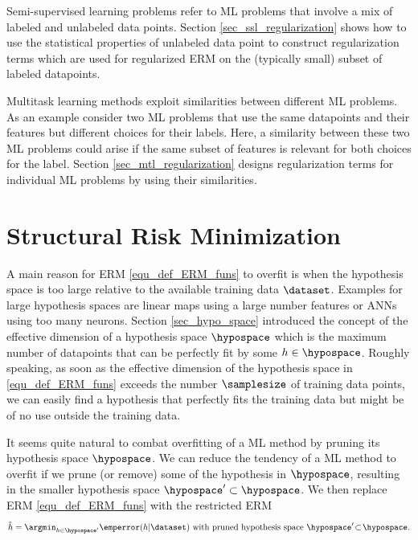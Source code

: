 \documentclass[12pt]{report}
\begin{document}
Semi-supervised learning problems refer to ML problems that involve a mix of 
labeled and unlabeled data points. Section \ref{sec_ssl_regularization} shows 
how to use the statistical properties of unlabeled data point to construct 
regularization terms which are used for regularized ERM on the (typically small) 
subset of labeled datapoints. 

Multitask learning methods exploit similarities between different ML problems. 
As an example consider two ML problems that use the same datapoints and 
their features but different choices for their labels. Here, a similarity between 
these two ML problems could arise if the same subset of features is relevant 
for both choices for the label. Section \ref{sec_mtl_regularization} designs 
regularization terms for individual ML problems by using their similarities. 



\section{Structural Risk Minimization} 
\label{sec_reg_ERM}

A main reason for ERM \eqref{equ_def_ERM_funs} to overfit is when the hypothesis space is 
too large relative to the available training data $\dataset$. Examples for large hypothesis spaces 
are linear maps using a large number features or ANNs using too many neurons. Section \ref{sec_hypo_space} 
introduced the concept of the effective dimension of a hypothesis space $\hypospace$ which 
is the maximum number of datapoints that can be perfectly fit by some $h \in \hypospace$. 
Roughly speaking, as soon as the effective dimension of the hypothesis space in \eqref{equ_def_ERM_funs} 
exceeds the number $\samplesize$ of training data points, we can easily find a hypothesis that 
perfectly fits the training data but might be of no use outside the training data. 

It seems quite natural to combat overfitting of a ML method by pruning its 
hypothesis space $\hypospace$. We can reduce the tendency of a ML method 
to overfit if we prune (or remove) some of the hypothesis in $\hypospace$, 
resulting in the smaller hypothesis space $\hypospace' \subset \hypospace$. 
We then replace ERM \eqref{equ_def_ERM_funs} with the restricted ERM 
\begin{equation}
\label{equ_ERM_fun_pruned}
\hat{h} = \argmin_{h \in \hypospace'} \emperror(h|\dataset) \mbox{ with pruned hypothesis space } \hypospace' \!\subset\!\hypospace. 
\end{equation}
\end{document}
